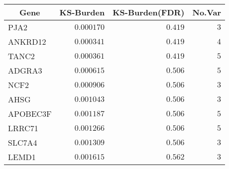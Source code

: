 \begin{tabular}{lrrr}
\hline\hline
\multicolumn{1}{c}{Gene}&\multicolumn{1}{c}{KS-Burden}&\multicolumn{1}{c}{KS-Burden(FDR)}&\multicolumn{1}{c}{No.Var}\tabularnewline
\hline
PJA2&$0.000170$&$0.419$&$3$\tabularnewline
ANKRD12&$0.000341$&$0.419$&$4$\tabularnewline
TANC2&$0.000361$&$0.419$&$5$\tabularnewline
ADGRA3&$0.000615$&$0.506$&$5$\tabularnewline
NCF2&$0.000906$&$0.506$&$3$\tabularnewline
AHSG&$0.001043$&$0.506$&$3$\tabularnewline
APOBEC3F&$0.001187$&$0.506$&$5$\tabularnewline
LRRC71&$0.001266$&$0.506$&$5$\tabularnewline
SLC7A4&$0.001309$&$0.506$&$3$\tabularnewline
LEMD1&$0.001615$&$0.562$&$3$\tabularnewline
\hline
\end{tabular}
